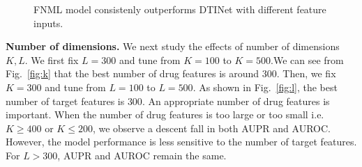 \documentclass[conference]{IEEEtran}
\begin{document}
\begin{figure}[!ht]
\centering
{}

\vspace*{-10pt}
\caption{FNML model consistenly outperforms DTINet with different feature inputs.}\label{fig:stability}
\end{figure}



\textbf{Number of dimensions.}  We next study the effects of number of dimensions $K,L$. We first fix $L=300$ and tune from $K=100$ to $K=500$.We can see from Fig.~\ref{fig:k} that the best number of drug features is around $300$. Then, we fix $K=300$ and tune from $L=100$ to $L=500$. As shown in Fig.~\ref{fig:l}, the best number of target features is $300$. An appropriate number of drug features is important. When the number of drug features is too large or too small i.e. $K\ge400$ or $K\le200$, we observe a descent fall in both AUPR and AUROC. However, the model performance is less sensitive to the number of target features. For $L>300$, AUPR and AUROC remain the same.   
\end{document}
